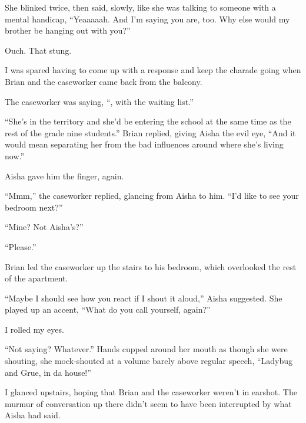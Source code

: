 She blinked twice, then said, slowly, like she was talking to someone with a mental handicap, ``Yeaaaaah.  And I'm saying you are, too.  Why else would my brother be hanging out with you?''



Ouch.  That stung.



I was spared having to come up with a response and keep the charade going when Brian and the caseworker came back from the balcony.



The caseworker was saying, ``\ldotshesitant, with the waiting list.''



``She's in the territory and she'd be entering the school at the same time as the rest of the grade nine students.'' Brian replied, giving Aisha the evil eye, ``And it would mean separating her from the bad influences around where she's living now.''



Aisha gave him the finger, again.



``Mmm,'' the caseworker replied, glancing from Aisha to him. ``I'd like to see your bedroom next?''



``Mine?  Not Aisha's?''



``Please.''



Brian led the caseworker up the stairs to his bedroom, which overlooked the rest of the apartment.



``Maybe I should see how you react if I shout it aloud,'' Aisha suggested.  She played up an accent, ``What do you call yourself, again?''



I rolled my eyes.



``Not saying?  Whatever.''  Hands cupped around her mouth as though she were shouting, she mock-shouted at a volume barely above regular speech, ``Ladybug and Grue, in da house!''



I glanced upstairs, hoping that Brian and the caseworker weren't in earshot.  The murmur of conversation up there didn't seem to have been interrupted by what Aisha had said.



